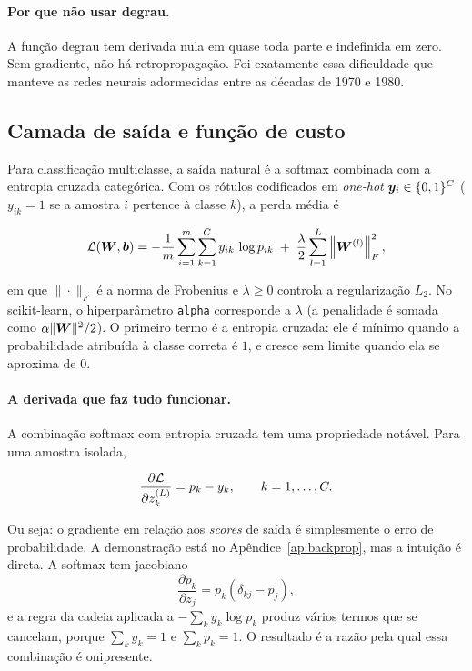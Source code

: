 \paragraph{Por que não usar degrau.} A função degrau tem derivada nula em quase toda parte e
indefinida em zero. Sem gradiente, não há retropropagação. Foi exatamente essa dificuldade que
manteve as redes neurais adormecidas entre as décadas de 1970 e 1980.

\subsection{Camada de saída e função de custo}
\label{sec:custo}

Para classificação multiclasse, a saída natural é a softmax  combinada com a
entropia cruzada categórica. Com os rótulos codificados em \emph{one-hot}
$\bm{y}_i \in \{0,1\}^{C}$ ($y_{ik}=1$ se a amostra $i$ pertence à classe $k$), a perda média é

\begin{equation}
	\mathcal{L}(\bm{W},\bm{b}) = -\frac{1}{m}\sum_{i=1}^{m}\sum_{k=1}^{C} y_{ik}\,\log p_{ik}
	\;+\; \frac{\lambda}{2}\sum_{l=1}^{L}\left\|\bm{W}^{(l)}\right\|_F^2,
	\label{eq:cross-entropy}
\end{equation}

em que $\|\cdot\|_F$ é a norma de Frobenius e $\lambda \ge 0$ controla a regularização $L_2$.
No scikit-learn, o hiperparâmetro \texttt{alpha} corresponde a $\lambda$ (a penalidade é somada
como $\alpha\|\bm{W}\|^2/2$). O primeiro termo é a entropia cruzada: ele é mínimo quando a
probabilidade atribuída à classe correta é $1$, e cresce sem limite quando ela se aproxima de $0$.

\paragraph{A derivada que faz tudo funcionar.} A combinação softmax com entropia cruzada tem uma
propriedade notável. Para uma amostra isolada,

\begin{equation}
	\frac{\partial \mathcal{L}}{\partial z_k^{(L)}} = p_k - y_k, \qquad k = 1,\dots,C.
	\label{eq:softmax-grad}
\end{equation}

Ou seja: o gradiente em relação aos \emph{scores} de saída é simplesmente o erro de probabilidade.
A demonstração está no Apêndice~\ref{ap:backprop}, mas a intuição é direta. A softmax tem
jacobiano
\begin{equation}
	\frac{\partial p_k}{\partial z_j} = p_k\left(\delta_{kj} - p_j\right),
	\label{eq:softmax-jacobiano}
\end{equation}
e a regra da cadeia aplicada a $-\sum_k y_k \log p_k$ produz vários termos que se cancelam, porque
$\sum_k y_k = 1$ e $\sum_k p_k = 1$. O resultado  é a razão pela qual
essa combinação é onipresente.

